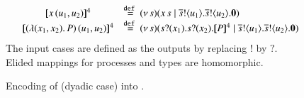 \begin{figure}[t]
\[\begin{array}{lcl}
	& \map{\appl{x}{(u_1, u_2)}}^{4} &\defeq \newsp{s}{\appl{x}{s} \Par \bout{\dual{s}}{u_1}   \bout{\dual{s}}{u_2} \inact}
	\\
	& \map{\appl{(\abs{(x_1,x_2)}{P})}{(u_1, u_2)}}^{4} &\defeq
	\newsp{s}{\binp{s}{x_1}  \binp{s}{x_2} \pmap{P}{4} \Par \bout{\dual{s}}{u_1}  \bout{\dual{s}}{u_2} \inact} 
\end{array}
\]
The input cases are defined as the outputs by replacing $!$ by $?$. 
Elided mappings for  processes and types are 
homomorphic.
\caption{\label{f:enc:poltomon}Encoding of \PHOp (dyadic case) into \HOp. }
\end{figure}

